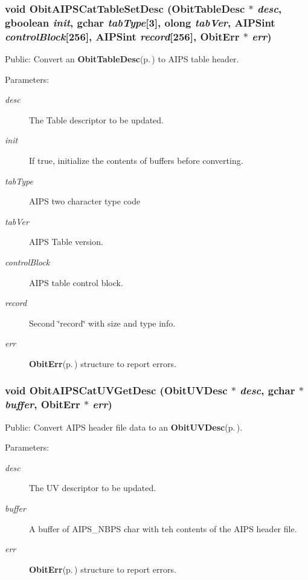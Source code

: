 \subsubsection{\setlength{\rightskip}{0pt plus 5cm}void Obit\-AIPSCat\-Table\-Set\-Desc ({\bf Obit\-Table\-Desc} $\ast$ {\em desc}, gboolean {\em init}, gchar {\em tab\-Type}[3], {\bf olong} {\em tab\-Ver}, {\bf AIPSint} {\em control\-Block}[256], {\bf AIPSint} {\em record}[256], {\bf Obit\-Err} $\ast$ {\em err})}\label{ObitAIPSCat_8h_a7}


Public: Convert an {\bf Obit\-Table\-Desc}{\rm (p.\,\pageref{structObitTableDesc})} to AIPS table header. 

\begin{Desc}
\item[Parameters:]
\begin{description}
\item[{\em desc}]The Table descriptor to be updated. \item[{\em init}]If true, initialize the contents of buffers before converting. \item[{\em tab\-Type}]AIPS two character type code \item[{\em tab\-Ver}]AIPS Table version. \item[{\em control\-Block}]AIPS table control block. \item[{\em record}]Second \char`\"{}record\char`\"{} with size and type info. \item[{\em err}]{\bf Obit\-Err}{\rm (p.\,\pageref{structObitErr})} structure to report errors. \end{description}
\end{Desc}
\subsubsection{\setlength{\rightskip}{0pt plus 5cm}void Obit\-AIPSCat\-UVGet\-Desc ({\bf Obit\-UVDesc} $\ast$ {\em desc}, gchar $\ast$ {\em buffer}, {\bf Obit\-Err} $\ast$ {\em err})}\label{ObitAIPSCat_8h_a2}


Public: Convert AIPS header file data to an {\bf Obit\-UVDesc}{\rm (p.\,\pageref{structObitUVDesc})}. 

\begin{Desc}
\item[Parameters:]
\begin{description}
\item[{\em desc}]The UV descriptor to be updated. \item[{\em buffer}]A buffer of AIPS\_\-NBPS char with teh contents of the AIPS header file. \item[{\em err}]{\bf Obit\-Err}{\rm (p.\,\pageref{structObitErr})} structure to report errors. \end{description}
\end{Desc}

